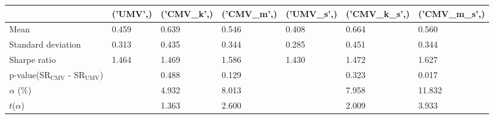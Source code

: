 \begin{tabular}{lllllll}
\toprule
 & ('UMV',) & ('CMV_k',) & ('CMV_m',) & ('UMV_s',) & ('CMV_k_s',) & ('CMV_m_s',) \\
\midrule
Mean & 0.459 & 0.639 & 0.546 & 0.408 & 0.664 & 0.560 \\
Standard deviation & 0.313 & 0.435 & 0.344 & 0.285 & 0.451 & 0.344 \\
Sharpe ratio & 1.464 & 1.469 & 1.586 & 1.430 & 1.472 & 1.627 \\
p-value(SR$_{\text{CMV}}$ - SR$_{\text{UMV}}$) &  & 0.488 & 0.129 &  & 0.323 & 0.017 \\
$\alpha$ (\%) &  & 4.932 & 8.013 &  & 7.958 & 11.832 \\
$t$($\alpha$) &  & 1.363 & 2.600 &  & 2.009 & 3.933 \\
\bottomrule
\end{tabular}
